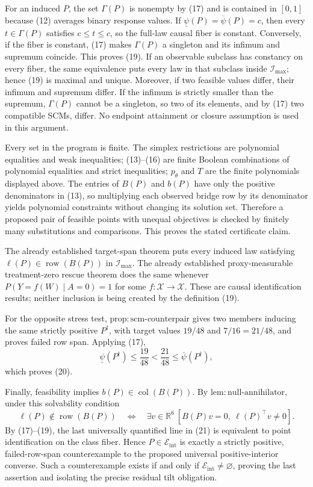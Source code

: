 For an induced \(P\), the set \(\Gamma(P)\) is nonempty by (17) and is contained
in \([0,1]\) because (12) averages binary response values.  If
\(\underline\psi(P)=\overline\psi(P)=c\), then every
\(t\in\Gamma(P)\) satisfies
\(c\le t\le c\), so the full-law causal fiber is constant.  Conversely, if the
fiber is constant, (17) makes \(\Gamma(P)\) a singleton and its infimum and
supremum coincide.  This proves (19).  If an observable subclass has constancy on
every fiber, the same equivalence puts every law in that subclass inside
\(\mathcal I_{\max}\); hence (19) is maximal and unique.  Moreover, if two
feasible values differ, their infimum and supremum differ.  If the infimum is
strictly smaller than the supremum, \(\Gamma(P)\) cannot be a singleton, so two
of its elements, and by (17) two compatible SCMs, differ.  No endpoint attainment
or closure assumption is used in this argument.

Every set in the program is finite.  The simplex restrictions are polynomial
equalities and weak inequalities; (13)--(16) are finite Boolean combinations of
polynomial equalities and strict inequalities; \(p_\theta\) and \(T\) are the
finite polynomials displayed above.  The entries of \(B(P)\) and \(b(P)\) have
only the positive denominators in (13), so multiplying each observed bridge row
by its denominator yields polynomial constraints without changing its solution
set.  Therefore a proposed pair of feasible points with unequal objectives is
checked by finitely many substitutions and comparisons.  This proves the stated
certificate claim.

The already established target-span theorem puts every induced law satisfying
\(\ell(P)\in\operatorname{row}(B(P))\) in \(\mathcal I_{\max}\).  The already
established proxy-measurable treatment-zero rescue theorem does the same whenever
\(P(Y=f(W)\mid A=0)=1\) for some \(f:\mathcal X\to\mathcal X\).  These are
causal identification results; neither inclusion is being created by the
definition (19).

For the opposite stress test, \(\mathrm{prop{:}scm\text{-}counterpair}\) gives
two members inducing the same strictly positive \(P^{\dagger}\), with target
values \(19/48\) and \(7/16=21/48\), and proves failed row span.  Applying (17),
\[
 \underline\psi(P^{\dagger})\le\frac{19}{48}
 <\frac{21}{48}\le\overline\psi(P^{\dagger}),
\]
which proves (20).

Finally, feasibility implies \(b(P)\in\operatorname{col}(B(P))\).  By
\(\mathrm{lem{:}null\text{-}annihilator}\), under this solvability condition
\[
 \ell(P)\notin\operatorname{row}(B(P))
 \quad\Longleftrightarrow\quad
 \exists v\in\mathbb R^6\ [B(P)v=0,\ \ell(P)^\top v\ne0].
 \tag{25}
\]
By (17)--(19), the last universally quantified line in (21) is equivalent to
point identification on the class fiber.  Hence \(P\in\mathcal E_{\mathrm{int}}\)
is exactly a strictly positive, failed-row-span counterexample to the proposed
universal positive-interior converse.  Such a counterexample exists if and only
if \(\mathcal E_{\mathrm{int}}\ne\varnothing\), proving the last assertion and
isolating the precise residual tilt obligation.